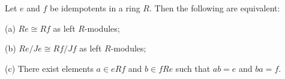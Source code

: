 Let $e$ and $f$ be idempotents in a ring $R$. Then the following are equivalent:

(a) $Re \cong Rf$ as left $R$-modules;

(b) $Re/Je \cong Rf/Jf$ as left $R$-modules;

(c) There exist elements $a \in eRf$ and $b \in fRe$ such that $ab = e$ and $ba = f$.

